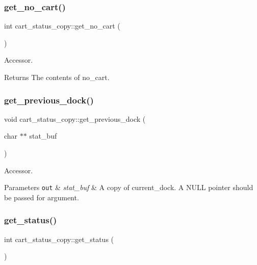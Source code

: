 \subsubsection{\texorpdfstring{get\+\_\+no\+\_\+cart()}{get\_no\_cart()}}
{\footnotesize\ttfamily int cart\+\_\+status\+\_\+copy\+::get\+\_\+no\+\_\+cart (\begin{DoxyParamCaption}{ }\end{DoxyParamCaption})}

Accessor. \begin{DoxyReturn}{Returns}
The contents of no\+\_\+cart. 
\end{DoxyReturn}
\mbox{\label{classcart__status__copy_a8341c76c3b3c10809ae24232dbe9b865}} 
\subsubsection{\texorpdfstring{get\+\_\+previous\+\_\+dock()}{get\_previous\_dock()}}
{\footnotesize\ttfamily void cart\+\_\+status\+\_\+copy\+::get\+\_\+previous\+\_\+dock (\begin{DoxyParamCaption}\item[{char $\ast$$\ast$}]{stat\+\_\+buf }\end{DoxyParamCaption})}

Accessor. 
\begin{DoxyParams}[1]{Parameters}
\mbox{\tt out}  & {\em stat\+\_\+buf} & A copy of current\+\_\+dock. A N\+U\+LL pointer should be passed for argument. \\
\hline
\end{DoxyParams}
\mbox{\label{classcart__status__copy_a482b6c7e3bcd3102028c59dacb70ad00}} 
\subsubsection{\texorpdfstring{get\+\_\+status()}{get\_status()}}
{\footnotesize\ttfamily int cart\+\_\+status\+\_\+copy\+::get\+\_\+status (\begin{DoxyParamCaption}{ }\end{DoxyParamCaption})}

